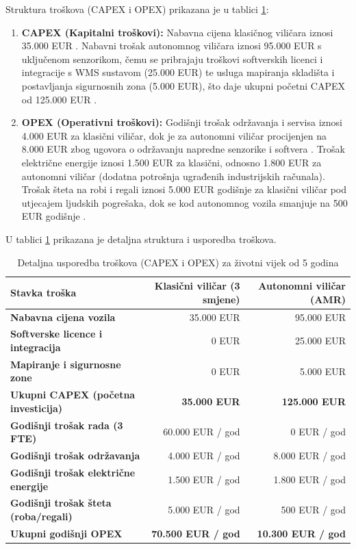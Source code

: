 Struktura troškova (CAPEX i OPEX) prikazana je u tablici \ref{tab:tco_detaljno}:
\begin{enumerate}
    \item \textbf{CAPEX (Kapitalni troškovi):} Nabavna cijena klasičnog viličara iznosi 35.000 EUR \cite{toyota, jungheinrich}. Nabavni trošak autonomnog viličara iznosi 95.000 EUR s uključenom senzorikom, čemu se pribrajaju troškovi softverskih licenci i integracije s WMS sustavom (25.000 EUR) te usluga mapiranja skladišta i postavljanja sigurnosnih zona (5.000 EUR), što daje ukupni početni CAPEX od 125.000 EUR \cite{toyota, jungheinrich}.
    \item \textbf{OPEX (Operativni troškovi):} Godišnji trošak održavanja i servisa iznosi 4.000 EUR za klasični viličar, dok je za autonomni viličar procijenjen na 8.000 EUR zbog ugovora o održavanju napredne senzorike i softvera \cite{toyota, jungheinrich}. Trošak električne energije iznosi 1.500 EUR za klasični, odnosno 1.800 EUR za autonomni viličar (dodatna potrošnja ugrađenih industrijskih računala). Trošak šteta na robi i regali iznosi 5.000 EUR godišnje za klasični viličar pod utjecajem ljudskih pogrešaka, dok se kod autonomnog vozila smanjuje na 500 EUR godišnje \cite{bowersox}.
\end{enumerate}

U tablici \ref{tab:tco_detaljno} prikazana je detaljna struktura i usporedba troškova.

\begin{table}[h]
\centering
\caption{Detaljna usporedba troškova (CAPEX i OPEX) za životni vijek od 5 godina}
\label{tab:tco_detaljno}
\begin{tabularx}{\textwidth}{|l|r|r|}
\hline
\textbf{Stavka troška} & \textbf{Klasični viličar (3 smjene)} & \textbf{Autonomni viličar (AMR)} \\ \hline
\textbf{Nabavna cijena vozila} & 35.000 EUR & 95.000 EUR \\ \hline
\textbf{Softverske licence i integracija} & 0 EUR & 25.000 EUR \\ \hline
\textbf{Mapiranje i sigurnosne zone} & 0 EUR & 5.000 EUR \\ \hline
\textbf{Ukupni CAPEX (početna investicija)} & \textbf{35.000 EUR} & \textbf{125.000 EUR} \\ \hline
\textbf{Godišnji trošak rada (3 FTE)} & 60.000 EUR / god & 0 EUR / god \\ \hline
\textbf{Godišnji trošak održavanja} & 4.000 EUR / god & 8.000 EUR / god \\ \hline
\textbf{Godišnji trošak električne energije} & 1.500 EUR / god & 1.800 EUR / god \\ \hline
\textbf{Godišnji trošak šteta (roba/regali)} & 5.000 EUR / god & 500 EUR / god \\ \hline
\textbf{Ukupni godišnji OPEX} & \textbf{70.500 EUR / god} & \textbf{10.300 EUR / god} \\ \hline
\end{tabularx}
\end{table}

